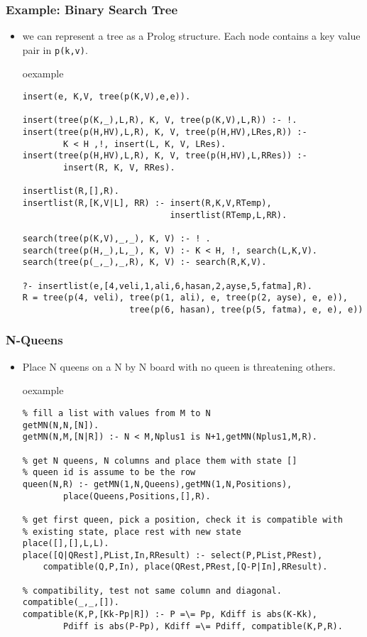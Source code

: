 \begin{frame}[fragile]
\frametitle{Example: Binary Search Tree}
\small
\begin{itemize}
\item we can represent a tree as a Prolog structure. Each
node contains a key value pair in \lstinline!p(k,v)!.\\
\begin{beamercolorbox}{oexample}
\begin{lstlisting}[basicstyle=\scriptsize\ttfamily]
insert(e, K,V, tree(p(K,V),e,e)).

insert(tree(p(K,_),L,R), K, V, tree(p(K,V),L,R)) :- !.
insert(tree(p(H,HV),L,R), K, V, tree(p(H,HV),LRes,R)) :- 
        K < H ,!, insert(L, K, V, LRes).
insert(tree(p(H,HV),L,R), K, V, tree(p(H,HV),L,RRes)) :-
        insert(R, K, V, RRes).

insertlist(R,[],R).
insertlist(R,[K,V|L], RR) :- insert(R,K,V,RTemp), 
                             insertlist(RTemp,L,RR).

search(tree(p(K,V),_,_), K, V) :- ! .
search(tree(p(H,_),L,_), K, V) :- K < H, !, search(L,K,V).
search(tree(p(_,_),_,R), K, V) :- search(R,K,V).

?- insertlist(e,[4,veli,1,ali,6,hasan,2,ayse,5,fatma],R).
R = tree(p(4, veli), tree(p(1, ali), e, tree(p(2, ayse), e, e)), 
                     tree(p(6, hasan), tree(p(5, fatma), e, e), e))
\end{lstlisting}
\end{beamercolorbox}
\end{itemize}
\end{frame}

\begin{frame}[fragile]
\frametitle{N-Queens}
\small
\begin{itemize}
\item Place N queens on a N by N board with
	no queen is threatening others.\\
\begin{beamercolorbox}{oexample}
\begin{lstlisting}
% fill a list with values from M to N
getMN(N,N,[N]).
getMN(N,M,[N|R]) :- N < M,Nplus1 is N+1,getMN(Nplus1,M,R).

% get N queens, N columns and place them with state []
% queen id is assume to be the row
queen(N,R) :- getMN(1,N,Queens),getMN(1,N,Positions),
        place(Queens,Positions,[],R).

% get first queen, pick a position, check it is compatible with
% existing state, place rest with new state
place([],[],L,L).
place([Q|QRest],PList,In,RResult) :- select(P,PList,PRest), 
    compatible(Q,P,In), place(QRest,PRest,[Q-P|In],RResult).

% compatibility, test not same column and diagonal. 
compatible(_,_,[]).
compatible(K,P,[Kk-Pp|R]) :- P =\= Pp, Kdiff is abs(K-Kk), 
        Pdiff is abs(P-Pp), Kdiff =\= Pdiff, compatible(K,P,R).
\end{lstlisting}
\end{beamercolorbox}
\end{itemize}
\end{frame}

